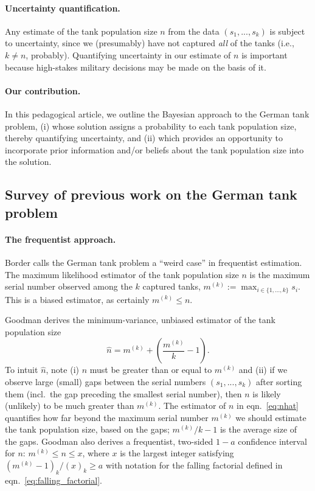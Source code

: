 \documentclass[11pt, oneside]{article}
\newcommand{\data}{$(s_1, ..., s_k)$\xspace}
\begin{document}
\paragraph{Uncertainty quantification.}
Any estimate of the tank population size $n$ from the data \data is subject to uncertainty, since we (presumably) have not captured \emph{all} of the tanks (i.e., $k\neq n$, probably).  
Quantifying uncertainty in our estimate of $n$ is important because high-stakes military decisions may be made on the basis of it.

\paragraph{Our contribution.}
In this pedagogical article, we outline the Bayesian approach to the German tank problem, 
(i) whose solution assigns a probability to each tank population size, thereby quantifying uncertainty, and
(ii) which provides an opportunity to incorporate prior information and/or beliefs about the tank population size into the solution.


\subsection{Survey of previous work on the German tank problem}
\paragraph{The frequentist approach.}
Border \cite{bordernotes} calls the German tank problem a ``weird case'' in frequentist estimation. The maximum likelihood estimator of the tank population size $n$ is the maximum serial number observed among the $k$ captured tanks, $m^{(k)}:=\max_{i \in \{1, ..., k\}} s_i$. This is a biased estimator, as certainly $m^{(k)} \leq n$.

Goodman \cite{goodman1952serial,goodman1954some} derives the minimum-variance, unbiased estimator of the tank population size
\begin{equation}
	\hat{n} = m^{(k)} + \left(\frac{m^{(k)}}{k}-1 \right). \label{eq:nhat}
\end{equation}
To intuit $\hat{n}$, note (i) $n$ must be greater than or equal to $m^{(k)}$ and (ii) if we observe large (small) gaps between the serial numbers \data after sorting them (incl.\ the gap preceding the smallest serial number), then $n$ is likely (unlikely) to be much greater than $m^{(k)}$. 
The estimator of $n$ in eqn.~\ref{eq:nhat} quantifies how far beyond the maximum serial number $m^{(k)}$ we should estimate the tank population size, based on the gaps; $m^{(k)}/k-1$ is the average size of the gaps.
Goodman \cite{goodman1952serial} also derives a frequentist, two-sided $1-a$ confidence interval for $n$: $m^{(k)}\leq n \leq x$, where $x$ is the largest integer satisfying $(m^{(k)}-1)_{k} /(x)_k \geq a$ with notation for the falling factorial defined in eqn.~\ref{eq:falling_factorial}.
\end{document}
